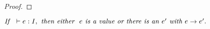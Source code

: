 \begin{proof}
\end{proof}

\begin{theorem}[Progress]
$\textit{If } \ \; {\vdash} \; e : I, \textit{ then either } \ e 
\textit{ is a value or there is an } e' \textit{ with } e \rightarrow e'.$
\end{theorem}
